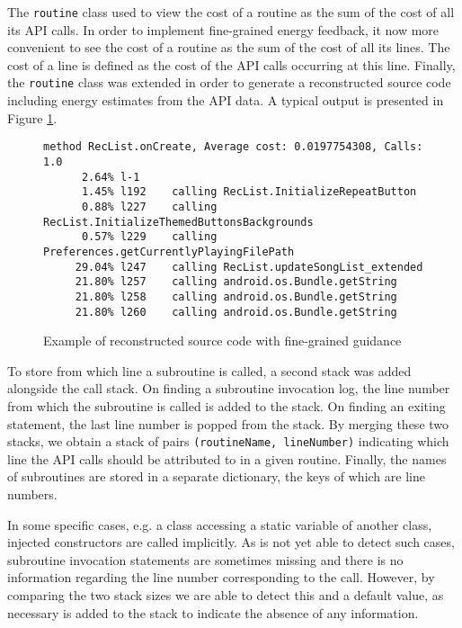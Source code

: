 The \texttt{routine} class used to view the cost of a routine as the sum 
of the cost of all its API calls. In order to implement fine-grained 
energy feedback, it now more convenient to see the cost of a routine as 
the sum of the cost of all its lines. The cost of a line is defined as 
the cost of the API calls occurring at this line. Finally, the 
\texttt{routine} class was extended in order to generate a reconstructed 
source code including energy estimates from the API data. A typical 
output is presented in Figure \ref{fig:sourcelinefeedback}.

\begin{figure}
\centering
\begin{lstlisting}
method RecList.onCreate, Average cost: 0.0197754308, Calls: 1.0
      2.64% l-1
      1.45% l192    calling RecList.InitializeRepeatButton
      0.88% l227    calling RecList.InitializeThemedButtonsBackgrounds
      0.57% l229    calling Preferences.getCurrentlyPlayingFilePath
     29.04% l247    calling RecList.updateSongList_extended
     21.80% l257    calling android.os.Bundle.getString
     21.80% l258    calling android.os.Bundle.getString
     21.80% l260    calling android.os.Bundle.getString
\end{lstlisting}
\caption{Example of reconstructed source code with fine-grained guidance}
\label{fig:sourcelinefeedback}
\vspace{-0.32in}
\end{figure}

To store from which line a subroutine is called, a second stack was 
added alongside the call stack. On finding a subroutine invocation log, 
the line number from which the subroutine is called is added to the 
stack. On finding an exiting statement, the last line number is popped 
from the stack. By merging these two stacks, we obtain a stack of pairs 
\texttt{(routineName, lineNumber)} indicating which line the API
calls should be attributed to in a given routine. Finally, the names of 
subroutines are stored in a separate dictionary, the keys of which are 
line numbers.

In some specific cases, e.g. a class accessing a static variable of 
another class, injected constructors are called implicitly. As \Orka{} 
is not yet able to detect such cases, subroutine invocation statements 
are sometimes missing and there is no information regarding the line 
number corresponding to the call. However, by comparing the two stack 
sizes we are able to detect this and a default value, as necessary is 
added to the stack to indicate the absence of any information.

